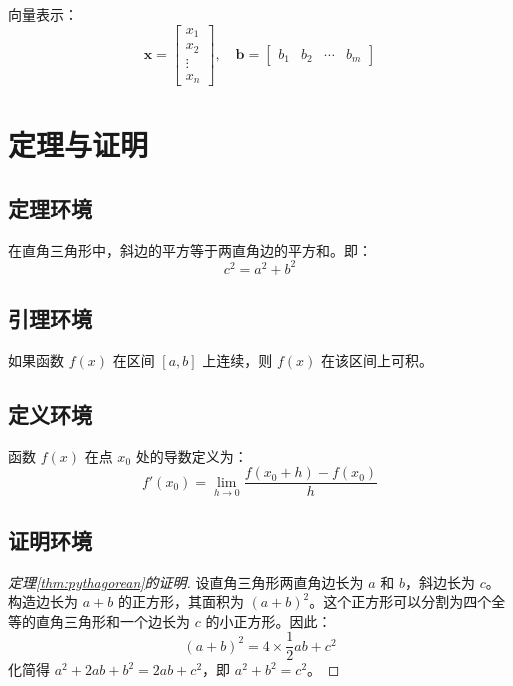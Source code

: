 向量表示：
\[
\mathbf{x} = \begin{bmatrix}
x_1 \\ x_2 \\ \vdots \\ x_n
\end{bmatrix}, \quad
\mathbf{b} = \begin{bmatrix}
b_1 & b_2 & \cdots & b_m
\end{bmatrix}
\]

\section{定理与证明}
\label{sec:theorems}

\subsection{定理环境}
\begin{theorem}[勾股定理]
\label{thm:pythagorean}
在直角三角形中，斜边的平方等于两直角边的平方和。即：
\begin{equation}
c^2 = a^2 + b^2
\end{equation}
\end{theorem}

\subsection{引理环境}
\begin{lemma}
\label{lem:example}
如果函数 $f(x)$ 在区间 $[a,b]$ 上连续，则 $f(x)$ 在该区间上可积。
\end{lemma}

\subsection{定义环境}
\begin{definition}[导数]
\label{def:derivative}
函数 $f(x)$ 在点 $x_0$ 处的导数定义为：
\begin{equation}
f'(x_0) = \lim_{h \to 0} \frac{f(x_0 + h) - f(x_0)}{h}
\end{equation}
\end{definition}

\subsection{证明环境}
\begin{proof}[定理\ref{thm:pythagorean}的证明]
设直角三角形两直角边长为 $a$ 和 $b$，斜边长为 $c$。构造边长为 $a+b$ 的正方形，其面积为 $(a+b)^2$。这个正方形可以分割为四个全等的直角三角形和一个边长为 $c$ 的小正方形。因此：
\[
(a+b)^2 = 4 \times \frac{1}{2}ab + c^2
\]
化简得 $a^2 + 2ab + b^2 = 2ab + c^2$，即 $a^2 + b^2 = c^2$。
\end{proof}

